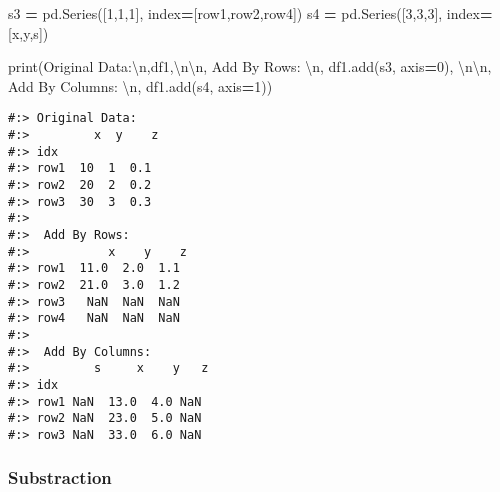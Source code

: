 \documentclass[
]{book}
\newenvironment{Shaded}{\begin{snugshade}}{\end{snugshade}}
\newcommand{\BuiltInTok}[1]{#1}
\newcommand{\CharTok}[1]{\textcolor[rgb]{0.5,0.5,0.5}{#1}}
\newcommand{\DecValTok}[1]{\textcolor[rgb]{0.06,0.06,0.06}{#1}}
\newcommand{\NormalTok}[1]{#1}
\newcommand{\OperatorTok}[1]{\textcolor[rgb]{0.43,0.43,0.43}{\textbf{#1}}}
\newcommand{\StringTok}[1]{\textcolor[rgb]{0.5,0.5,0.5}{#1}}
\begin{document}
\begin{Shaded}
\begin{Highlighting}[]
\NormalTok{s3 }\OperatorTok{=}\NormalTok{ pd.Series([}\DecValTok{1}\NormalTok{,}\DecValTok{1}\NormalTok{,}\DecValTok{1}\NormalTok{], index}\OperatorTok{=}\NormalTok{[}\StringTok{\textquotesingle{}row1\textquotesingle{}}\NormalTok{,}\StringTok{\textquotesingle{}row2\textquotesingle{}}\NormalTok{,}\StringTok{\textquotesingle{}row4\textquotesingle{}}\NormalTok{])}
\NormalTok{s4 }\OperatorTok{=}\NormalTok{ pd.Series([}\DecValTok{3}\NormalTok{,}\DecValTok{3}\NormalTok{,}\DecValTok{3}\NormalTok{], index}\OperatorTok{=}\NormalTok{[}\StringTok{\textquotesingle{}x\textquotesingle{}}\NormalTok{,}\StringTok{\textquotesingle{}y\textquotesingle{}}\NormalTok{,}\StringTok{\textquotesingle{}s\textquotesingle{}}\NormalTok{])}

\BuiltInTok{print}\NormalTok{(}\StringTok{\textquotesingle{}Original Data:}\CharTok{\textbackslash{}n}\StringTok{\textquotesingle{}}\NormalTok{,df1,}\StringTok{\textquotesingle{}}\CharTok{\textbackslash{}n\textbackslash{}n}\StringTok{\textquotesingle{}}\NormalTok{,}
      \StringTok{\textquotesingle{}Add By Rows: }\CharTok{\textbackslash{}n}\StringTok{\textquotesingle{}}\NormalTok{, df1.add(s3, axis}\OperatorTok{=}\DecValTok{0}\NormalTok{), }\StringTok{\textquotesingle{}}\CharTok{\textbackslash{}n\textbackslash{}n}\StringTok{\textquotesingle{}}\NormalTok{,}
      \StringTok{\textquotesingle{}Add By Columns: }\CharTok{\textbackslash{}n}\StringTok{\textquotesingle{}}\NormalTok{, df1.add(s4, axis}\OperatorTok{=}\DecValTok{1}\NormalTok{))}
\end{Highlighting}
\end{Shaded}

\begin{verbatim}
#:> Original Data:
#:>         x  y    z
#:> idx             
#:> row1  10  1  0.1
#:> row2  20  2  0.2
#:> row3  30  3  0.3 
#:> 
#:>  Add By Rows: 
#:>           x    y    z
#:> row1  11.0  2.0  1.1
#:> row2  21.0  3.0  1.2
#:> row3   NaN  NaN  NaN
#:> row4   NaN  NaN  NaN 
#:> 
#:>  Add By Columns: 
#:>         s     x    y   z
#:> idx                    
#:> row1 NaN  13.0  4.0 NaN
#:> row2 NaN  23.0  5.0 NaN
#:> row3 NaN  33.0  6.0 NaN
\end{verbatim}

\hypertarget{substraction}{%
\subsubsection{Substraction}\label{substraction}}
\end{document}
